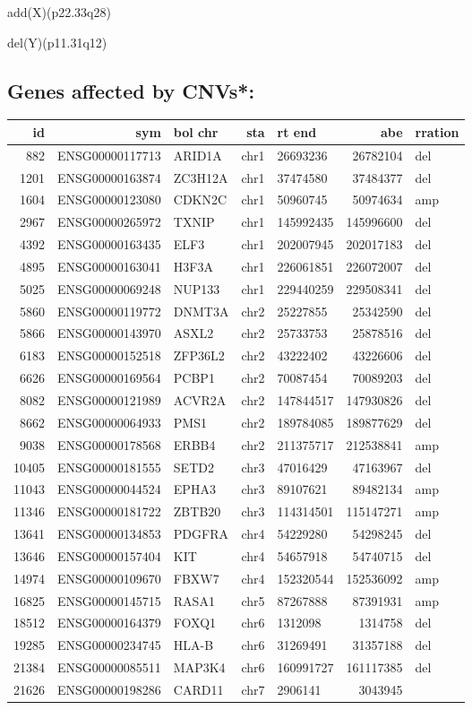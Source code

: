 \documentclass[]{article}
\begin{document}
add(X)(p22.33q28)

del(Y)(p11.31q12)

\hypertarget{genes-affected-by-cnvs}{%
\subsection{Genes affected by CNVs*:}\label{genes-affected-by-cnvs}}

\begin{longtable}[]{@{}rrlrlrl@{}}
\toprule
id & sym & bol chr & sta & rt end & abe & rration\tabularnewline
\midrule
\endhead
882 & ENSG00000117713 & ARID1A & chr1 & 26693236 & 26782104 &
del\tabularnewline
1201 & ENSG00000163874 & ZC3H12A & chr1 & 37474580 & 37484377 &
del\tabularnewline
1604 & ENSG00000123080 & CDKN2C & chr1 & 50960745 & 50974634 &
amp\tabularnewline
2967 & ENSG00000265972 & TXNIP & chr1 & 145992435 & 145996600 &
del\tabularnewline
4392 & ENSG00000163435 & ELF3 & chr1 & 202007945 & 202017183 &
del\tabularnewline
4895 & ENSG00000163041 & H3F3A & chr1 & 226061851 & 226072007 &
del\tabularnewline
5025 & ENSG00000069248 & NUP133 & chr1 & 229440259 & 229508341 &
del\tabularnewline
5860 & ENSG00000119772 & DNMT3A & chr2 & 25227855 & 25342590 &
del\tabularnewline
5866 & ENSG00000143970 & ASXL2 & chr2 & 25733753 & 25878516 &
del\tabularnewline
6183 & ENSG00000152518 & ZFP36L2 & chr2 & 43222402 & 43226606 &
del\tabularnewline
6626 & ENSG00000169564 & PCBP1 & chr2 & 70087454 & 70089203 &
del\tabularnewline
8082 & ENSG00000121989 & ACVR2A & chr2 & 147844517 & 147930826 &
del\tabularnewline
8662 & ENSG00000064933 & PMS1 & chr2 & 189784085 & 189877629 &
del\tabularnewline
9038 & ENSG00000178568 & ERBB4 & chr2 & 211375717 & 212538841 &
amp\tabularnewline
10405 & ENSG00000181555 & SETD2 & chr3 & 47016429 & 47163967 &
del\tabularnewline
11043 & ENSG00000044524 & EPHA3 & chr3 & 89107621 & 89482134 &
amp\tabularnewline
11346 & ENSG00000181722 & ZBTB20 & chr3 & 114314501 & 115147271 &
amp\tabularnewline
13641 & ENSG00000134853 & PDGFRA & chr4 & 54229280 & 54298245 &
del\tabularnewline
13646 & ENSG00000157404 & KIT & chr4 & 54657918 & 54740715 &
del\tabularnewline
14974 & ENSG00000109670 & FBXW7 & chr4 & 152320544 & 152536092 &
amp\tabularnewline
16825 & ENSG00000145715 & RASA1 & chr5 & 87267888 & 87391931 &
amp\tabularnewline
18512 & ENSG00000164379 & FOXQ1 & chr6 & 1312098 & 1314758 &
del\tabularnewline
19285 & ENSG00000234745 & HLA-B & chr6 & 31269491 & 31357188 &
del\tabularnewline
21384 & ENSG00000085511 & MAP3K4 & chr6 & 160991727 & 161117385 &
del\tabularnewline
21626 & ENSG00000198286 & CARD11 & chr7 & 2906141 & 3043945 &

\end{longtable}
\end{document}
